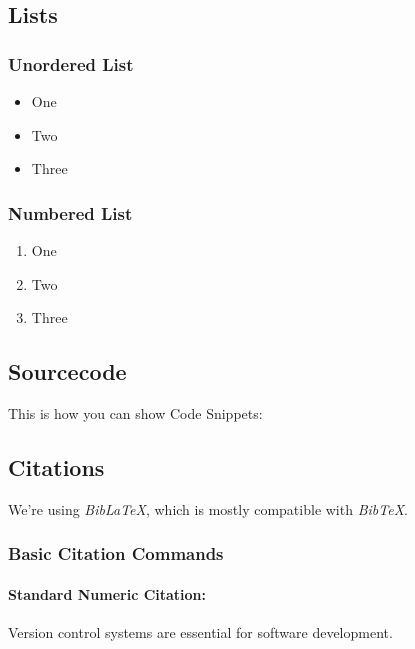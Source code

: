 \subsection{Lists}

\subsubsection{Unordered List}
\begin{itemize}
    \item One
    \item Two
    \item Three
\end{itemize}

\subsubsection{Numbered List}

\begin{enumerate}
    \item One
    \item Two
    \item Three
\end{enumerate}

\subsection{Sourcecode}

This is how you can show Code Snippets:

\noindent
\begin{minipage}{\linewidth}

\end{minipage}

\subsection{Citations}
We're using \textit{BibLaTeX}, which is mostly compatible with \textit{BibTeX}\cite{biblatex-bibtex-compatibility}.

\subsubsection{Basic Citation Commands}

\paragraph{Standard Numeric Citation:}
Version control systems are essential for software development\cite{git}.
\\

